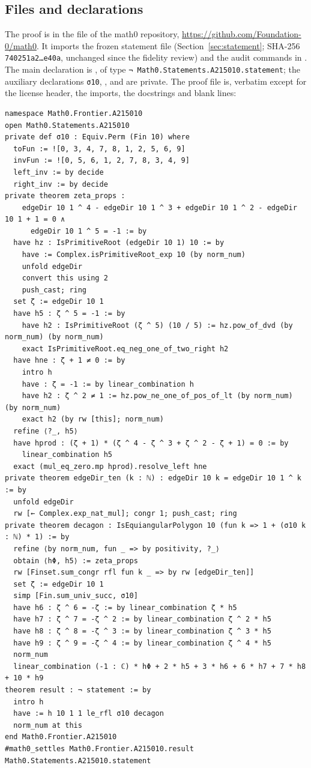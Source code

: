 \documentclass[11pt]{amsart}
\theoremstyle{plain}
\theoremstyle{definition}
\begin{document}
\subsection*{Files and declarations}
The proof is in the file  of the math0 repository, \url{https://github.com/Foundation-0/math0}.
It imports the frozen statement file  (Section~\ref{sec:statement}; SHA-256 \texttt{740251a2\ldots e40a}, unchanged since the fidelity review) and the audit commands in .
The main declaration is , of type \texttt{¬ Math0.Statements.A215010.statement}; the auxiliary declarations \texttt{σ10}, ,  and  are private.
The proof file is, verbatim except for the license header, the imports, the docstrings and blank lines:
\begin{lstlisting}[basicstyle=\ttfamily\scriptsize]
namespace Math0.Frontier.A215010
open Math0.Statements.A215010
private def σ10 : Equiv.Perm (Fin 10) where
  toFun := ![0, 3, 4, 7, 8, 1, 2, 5, 6, 9]
  invFun := ![0, 5, 6, 1, 2, 7, 8, 3, 4, 9]
  left_inv := by decide
  right_inv := by decide
private theorem zeta_props :
    edgeDir 10 1 ^ 4 - edgeDir 10 1 ^ 3 + edgeDir 10 1 ^ 2 - edgeDir 10 1 + 1 = 0 ∧
      edgeDir 10 1 ^ 5 = -1 := by
  have hz : IsPrimitiveRoot (edgeDir 10 1) 10 := by
    have := Complex.isPrimitiveRoot_exp 10 (by norm_num)
    unfold edgeDir
    convert this using 2
    push_cast; ring
  set ζ := edgeDir 10 1
  have h5 : ζ ^ 5 = -1 := by
    have h2 : IsPrimitiveRoot (ζ ^ 5) (10 / 5) := hz.pow_of_dvd (by norm_num) (by norm_num)
    exact IsPrimitiveRoot.eq_neg_one_of_two_right h2
  have hne : ζ + 1 ≠ 0 := by
    intro h
    have : ζ = -1 := by linear_combination h
    have h2 : ζ ^ 2 ≠ 1 := hz.pow_ne_one_of_pos_of_lt (by norm_num) (by norm_num)
    exact h2 (by rw [this]; norm_num)
  refine ⟨?_, h5⟩
  have hprod : (ζ + 1) * (ζ ^ 4 - ζ ^ 3 + ζ ^ 2 - ζ + 1) = 0 := by
    linear_combination h5
  exact (mul_eq_zero.mp hprod).resolve_left hne
private theorem edgeDir_ten (k : ℕ) : edgeDir 10 k = edgeDir 10 1 ^ k := by
  unfold edgeDir
  rw [← Complex.exp_nat_mul]; congr 1; push_cast; ring
private theorem decagon : IsEquiangularPolygon 10 (fun k => 1 + (σ10 k : ℕ) * 1) := by
  refine ⟨by norm_num, fun _ => by positivity, ?_⟩
  obtain ⟨hΦ, h5⟩ := zeta_props
  rw [Finset.sum_congr rfl fun k _ => by rw [edgeDir_ten]]
  set ζ := edgeDir 10 1
  simp [Fin.sum_univ_succ, σ10]
  have h6 : ζ ^ 6 = -ζ := by linear_combination ζ * h5
  have h7 : ζ ^ 7 = -ζ ^ 2 := by linear_combination ζ ^ 2 * h5
  have h8 : ζ ^ 8 = -ζ ^ 3 := by linear_combination ζ ^ 3 * h5
  have h9 : ζ ^ 9 = -ζ ^ 4 := by linear_combination ζ ^ 4 * h5
  norm_num
  linear_combination (-1 : ℂ) * hΦ + 2 * h5 + 3 * h6 + 6 * h7 + 7 * h8 + 10 * h9
theorem result : ¬ statement := by
  intro h
  have := h 10 1 1 le_rfl σ10 decagon
  norm_num at this
end Math0.Frontier.A215010
#math0_settles Math0.Frontier.A215010.result Math0.Statements.A215010.statement
\end{lstlisting}
\end{document}
